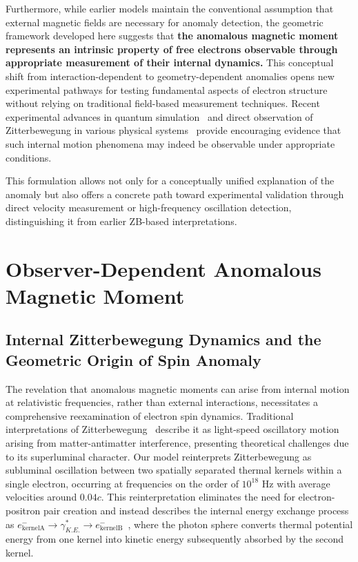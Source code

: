 \documentclass[%
 reprint,
 amsmath,amssymb,
 aps,
]{revtex4-1}
\numberwithin{equation}{section}%
\begin{document}
Furthermore, while earlier models maintain the conventional assumption that external magnetic fields are necessary for anomaly detection, the geometric framework developed here suggests that \textbf{the anomalous magnetic moment represents an intrinsic property of free electrons observable through appropriate measurement of their internal dynamics.} This conceptual shift from interaction-dependent to geometry-dependent anomalies opens new experimental pathways for testing fundamental aspects of electron structure without relying on traditional field-based measurement techniques. Recent experimental advances in quantum simulation~\cite{gerritsma2010} and direct observation of Zitterbewegung in various physical systems~\cite{leblanc2013, schliemann2005, zawadzki2011, zhang2023} provide encouraging evidence that such internal motion phenomena may indeed be observable under appropriate conditions.

This formulation allows not only for a conceptually unified explanation of the anomaly but also offers a concrete path toward experimental validation through direct velocity measurement or high-frequency oscillation detection, distinguishing it from earlier ZB-based interpretations.

\section{Observer-Dependent Anomalous Magnetic Moment}

\subsection{Internal Zitterbewegung Dynamics and the Geometric Origin of Spin Anomaly}

The revelation that anomalous magnetic moments can arise from internal motion at relativistic frequencies, rather than external interactions, necessitates a comprehensive reexamination of electron spin dynamics. Traditional interpretations of Zitterbewegung~\cite{schrodinger1930,hestenes1990,recami1995} describe it as light-speed oscillatory motion arising from matter-antimatter interference, presenting theoretical challenges due to its superluminal character. Our model reinterprets Zitterbewegung as subluminal oscillation between two spatially separated thermal kernels within a single electron, occurring at frequencies on the order of $10^{18}$ Hz with average velocities around $0.04c$. This reinterpretation eliminates the need for electron-positron pair creation and instead describes the internal energy exchange process as $e^-_{\text{kernelA}} \to \gamma^*_{K.E.} \to e^-_{\text{kernelB}}$~\cite{hanamura2309.0047}, where the photon sphere converts thermal potential energy from one kernel into kinetic energy subsequently absorbed by the second kernel.
\end{document}
